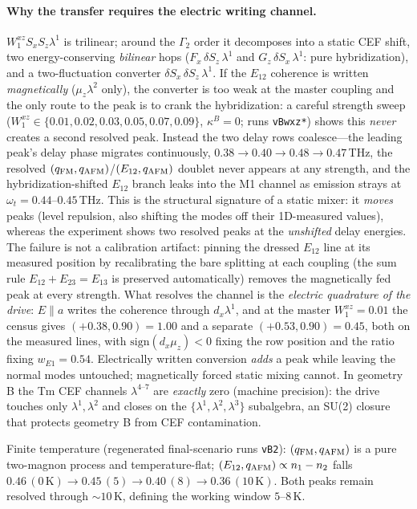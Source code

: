\documentclass[11pt]{article}
\newcommand{\qafm}{q_{\rm AFM}}
\newcommand{\qfm}{q_{\rm FM}}
\begin{document}
\paragraph{Why the transfer requires the electric writing channel.}
$W^{xz}_1 S_xS_z\lambda^1$ is trilinear; around the $\Gamma_2$ order it
decomposes into a static CEF shift, two energy-conserving
\emph{bilinear} hops ($F_x\,\delta S_z\,\lambda^1$ and
$G_z\,\delta S_x\,\lambda^1$: pure hybridization), and a
two-fluctuation converter $\delta S_x\,\delta S_z\,\lambda^1$.  If the
$E_{12}$ coherence is written \emph{magnetically} ($\mu_z\lambda^2$
only), the converter is too weak at the master coupling and the only
route to the peak is to crank the hybridization: a careful strength
sweep ($W^{xz}_1\in\{0.01,0.02,0.03,0.05,0.07,0.09\}$, $\kappa^B=0$;
runs \texttt{vBwxz*}) shows this \emph{never} creates a second
resolved peak.  Instead the two delay rows coalesce---the leading
peak's delay phase migrates continuously,
$0.38\to0.40\to0.48\to0.47$\,THz, the resolved
$(\qfm,\qafm)$/$(E_{12},\qafm)$ doublet never appears at any strength,
and the hybridization-shifted $E_{12}$ branch leaks into the M1 channel
as emission strays at $\omega_t=0.44$--$0.45$\,THz.  This is the
structural signature of a static mixer: it \emph{moves} peaks (level
repulsion, also shifting the modes off their 1D-measured values),
whereas the experiment shows two resolved peaks at the \emph{unshifted}
delay energies.  The failure is not a calibration artifact: pinning the
dressed $E_{12}$ line at its measured position by recalibrating the
bare splitting at each coupling (the sum rule
$E_{12}{+}E_{23}{=}E_{13}$ is preserved automatically) removes the
magnetically fed peak at every strength.  What resolves the channel is
the \emph{electric quadrature of the drive}: $E\!\parallel\!a$ writes
the coherence through $d_x\lambda^1$, and at the master
$W^{xz}_1=0.01$ the census gives $(+0.38,0.90)=1.00$ and a separate
$(+0.53,0.90)=0.45$, both on the measured lines, with
$\mathrm{sign}(d_x\mu_z)<0$ fixing the row position and the ratio
fixing $w_{E1}=0.54$.  Electrically written conversion \emph{adds} a
peak while leaving the normal modes untouched; magnetically forced
static mixing cannot.  In geometry B the Tm CEF channels
$\lambda^{4\text{--}7}$ are \emph{exactly} zero (machine precision):
the drive touches only $\lambda^1,\lambda^2$ and closes on the
$\{\lambda^1,\lambda^2,\lambda^3\}$ subalgebra, an SU(2) closure that
protects geometry B from CEF contamination.

Finite temperature (regenerated final-scenario runs \texttt{vB2}):
$(\qfm,\qafm)$ is a pure two-magnon process and temperature-flat;
$(E_{12},\qafm)\propto n_1-n_2$ falls
$0.46\,(0\,\mathrm K)\to0.45\,(5)\to0.40\,(8)\to0.36\,(10\,\mathrm K)$.
Both peaks remain resolved through $\sim10$\,K, defining the working
window $5$--$8$\,K.
\end{document}
